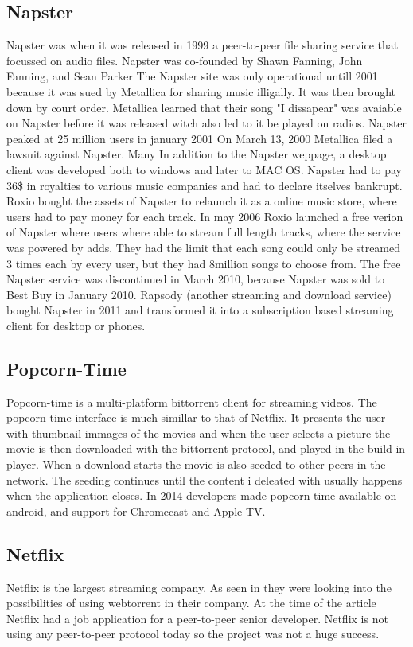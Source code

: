 \subsection{Napster}
Napster was when it was released in 1999 a peer-to-peer file sharing service that focussed on audio files. Napster was co-founded by Shawn Fanning, John Fanning, and Sean Parker The Napster site was only operational untill 2001 because it was sued by Metallica for sharing music illigally. It was then brought down by court order. Metallica learned that their song "I dissapear" was avaiable on Napster before it was released witch also led to it be played on radios. Napster peaked at 25 million users in january 2001 On March 13, 2000 Metallica filed a lawsuit against Napster. Many  In addition to the Napster weppage, a desktop client was developed both to windows and later to MAC OS.
Napster had to pay 36\$ in royalties to various music companies and had to declare itselves bankrupt. Roxio bought the assets of Napster to relaunch it as a online music store, where users had to pay money for each track. In may 2006 Roxio launched a free verion of Napster where users where able to stream full length tracks, where the service was powered by adds. They had the limit that each song could only be streamed 3 times each by every user, but they had 8million songs to choose from.
The free Napster service was discontinued in March 2010, because Napster was sold to Best Buy in January 2010.
Rapsody (another streaming and download service) bought Napster in 2011 and transformed it into a subscription based streaming client for desktop or phones.

\subsection{Popcorn-Time}
Popcorn-time is a multi-platform bittorrent client for streaming videos. The popcorn-time interface is much simillar to that of Netflix. It presents the user with thumbnail immages of the movies and when the user selects a picture the movie is then downloaded with the bittorrent protocol, and played in the build-in player.
 When a download starts the movie is also seeded to other peers in the network. The seeding continues until the content i deleated with usually happens when the application closes.
 In 2014 developers made popcorn-time available on android, and support for Chromecast and Apple TV.

\subsection{Netflix}
Netflix is the largest streaming company. As seen in \citep{netflix} they were looking into the possibilities of using webtorrent in their company. At the time of the article Netflix had a job application for a peer-to-peer senior developer. Netflix is not using any peer-to-peer protocol today so the project was not a huge success.

